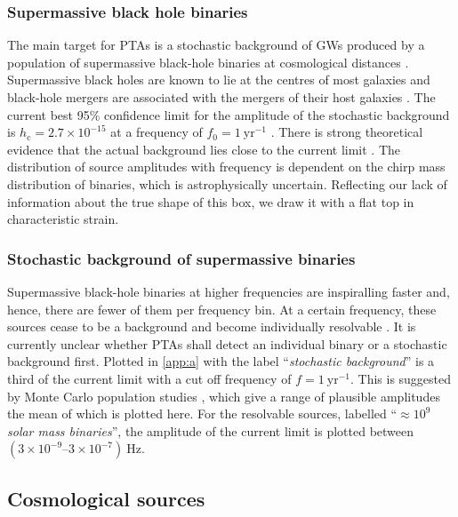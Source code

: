 \subsubsection{Supermassive black hole binaries}

The main target for PTAs is a stochastic background of GWs produced by a population of supermassive black-hole binaries at cosmological distances \citep{SesanaVecchioColancino}. Supermassive black holes are known to lie at the centres of most galaxies and black-hole mergers are associated with the mergers of their host galaxies \citep{Volonteri2003,Ferrarese2005}. The current best 95\% confidence limit for the amplitude of the stochastic background is $h_\mathrm{c} = 2.7\times 10^{-15}$ at a frequency of $f_{0}=1~\mathrm{yr}^{-1}$ \citep{Shannon2013}. There is strong theoretical evidence that the actual background lies close to the current limit \citep{Sesana-2012}. The distribution of source amplitudes with frequency is dependent on the chirp mass distribution of binaries, which is astrophysically uncertain. Reflecting our lack of information about the true shape of this box, we draw it with a flat top in characteristic strain.


\subsubsection {Stochastic background of supermassive binaries}
Supermassive black-hole binaries at higher frequencies are inspiralling faster and, hence, there are fewer of them per frequency bin. At a certain frequency, these sources cease to be a background and become individually resolvable \citep{SesanaVecchioColancino,Sesana2009}. It is currently unclear whether PTAs shall detect an individual binary or a stochastic background first. Plotted in \ref{app:a} with the label ``\emph{stochastic background}'' is a third of the current limit with a cut off frequency of $f=1~\mathrm{yr}^{-1}$. This is suggested by Monte Carlo population studies \citep{SesanaVecchioColancino}, which give a range of plausible amplitudes the mean of which is plotted here. For the resolvable sources, labelled ``\emph{$\mathit{\approx 10^{9}}$ solar mass binaries}'', the amplitude of the current limit is plotted between $\left(3\times 10^{-9}\right.$--$\left.3\times 10^{-7}\right)~\mathrm{Hz}$.




\subsection{Cosmological sources}

